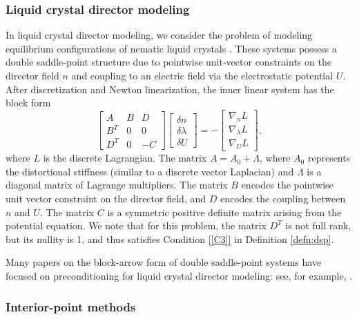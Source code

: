 \documentclass{article}
\begin{document}
\subsubsection{Liquid crystal director modeling} In liquid crystal director modeling, we consider the problem of modeling equilibrium configurations of nematic liquid crystals \cite{rg13}. These systems possess a double saddle‑point structure due to pointwise unit‑vector constraints on the director field $n$ and coupling to an electric field via the electrostatic potential $U$. After discretization and Newton linearization, the inner linear system has the block form
\[
\begin{bmatrix}
    A & B & D \\
    B^T & 0 & 0 \\
    D^T & 0 & -C
\end{bmatrix}\begin{bmatrix}
    \delta n \\
    \delta \lambda \\
    \delta U
\end{bmatrix} = - \begin{bmatrix}
    \nabla_n L \\
    \nabla_{\lambda} L \\
    \nabla_U L
\end{bmatrix},
\]
where $L$ is the discrete Lagrangian. The matrix $A = A_0 + \Lambda$, where $A_0$ represents the distortional stiffness (similar to a discrete vector Laplacian) and $\Lambda$ is a diagonal matrix of Lagrange multipliers. The matrix $B$ encodes the pointwise unit vector constraint on the director field, and $D$ encodes the coupling between $n$ and $U$. The matrix $C$ is a symmetric positive definite matrix arising from the potential equation. We note that for this problem, the matrix $D^T$ is not full rank, but its nullity is 1, and thus satisfies Condition \ref{[C3]} in Definition \ref{defn:dsp}.

Many papers on the block-arrow form of double saddle-point systems have focused on preconditioning for liquid crystal director modeling: see, for example, \cite{bb18,bb18b,ch24,cr23,z25,zl25,zzz25}.

\subsubsection{Interior-point methods}
\end{document}
